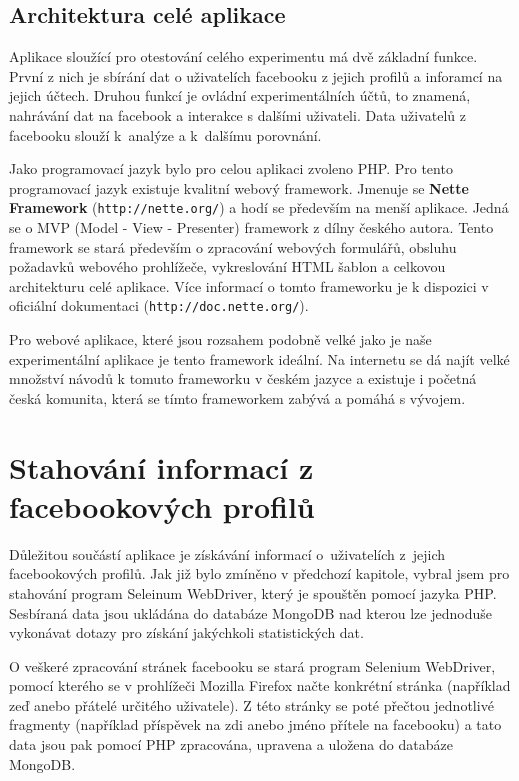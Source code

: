 \documentclass[thesis=M,czech]{FITthesis}[2013/05/10]
\begin{document}
\subsection{Architektura celé aplikace}

Aplikace sloužící pro otestování celého experimentu má dvě základní funkce. První z nich je sbírání dat o uživatelích facebooku z jejich profilů a inforamcí na jejich účtech. Druhou funkcí je ovládní experimentálních účtů, to znamená, nahrávání dat na facebook a interakce s dalšími uživateli. Data uživatelů z facebooku slouží k~analýze a k~dalšímu porovnání.

Jako programovací jazyk bylo pro celou aplikaci zvoleno PHP. Pro tento programovací jazyk existuje kvalitní webový framework. Jmenuje se \textbf{Nette Framework} (\verb|http://nette.org/|) a hodí se především na menší aplikace. Jedná se o MVP (Model - View - Presenter) framework z dílny českého autora. Tento framework se stará především o zpracování webových formulářů, obsluhu požadavků webového prohlížeče, vykreslování HTML šablon a celkovou architekturu celé aplikace. Více informací o tomto frameworku je k dispozici v oficiální dokumentaci (\verb|http://doc.nette.org/|). 

Pro webové aplikace, které jsou rozsahem podobně velké jako je naše experimentální aplikace je tento framework ideální. Na internetu se dá najít velké množství návodů k tomuto frameworku v českém jazyce a existuje i početná česká komunita, která se tímto frameworkem zabývá a pomáhá s vývojem. 


\section{Stahování informací z facebookových profilů}

Důležitou součástí aplikace je získávání informací o~uživatelích z~jejich facebookových profilů. Jak již bylo zmíněno v předchozí kapitole, vybral jsem pro stahování program Seleinum WebDriver, který je spouštěn pomocí jazyka PHP. Sesbíraná data jsou ukládána do databáze MongoDB nad kterou lze jednoduše vykonávat dotazy pro získání jakýchkoli statistických dat.

O veškeré zpracování stránek facebooku se stará program Selenium WebDriver, pomocí kterého se v prohlížeči Mozilla Firefox načte konkrétní stránka (například zeď anebo přátelé určitého uživatele). Z této stránky se poté přečtou jednotlivé fragmenty (například příspěvek na zdi anebo jméno přítele na facebooku) a tato data jsou pak pomocí PHP zpracována, upravena a uložena do databáze MongoDB. 
\end{document}
